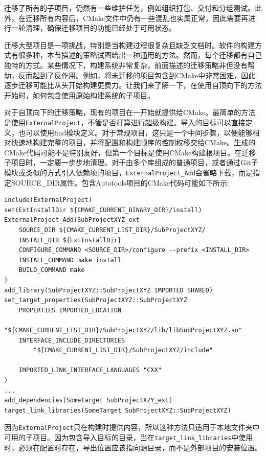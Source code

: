 迁移了所有的子项目，仍然有一些维护任务，例如组织打包、交付和分组测试。此外，在迁移所有内容后，CMake文件中仍有一些混乱也实属正常，因此需要再进行一轮清理，确保迁移项目的功能已经处于可用状态。

迁移大型项目是一项挑战，特别是当构建过程很复杂且缺乏文档时。软件的构建方式有很多种，本节描述的策略试图给出一种通用的方法。然而，每个迁移都有自己独特的方式。某些情况下，构建系统非常复杂，前面描述的迁移策略非但没有帮助，反而起到了反作用。例如，将未迁移的项目包含到CMake中非常困难，因此逐步迁移可能比从头开始构建更费力。让我们来了解一下，在使用自顶向下的方法开始时，如何包含使用原始构建系统的子项目。


对于自顶向下的迁移策略，现有的项目在一开始就提供给CMake。最简单的方法是使用\texttt{ExternalProject}，不管是否打算进行超级构建。导入的目标可以直接定义，也可以使用find模块定义。对于常规项目，这只是一个中间步骤，以便能够相对快速地构建完整的项目，并将配置和构建顺序的控制权移交给CMake。生成的CMake代码可能不是特别友好，但第一个目标是使用CMake构建根项目。在迁移子项目时，一定要一步步地清理。对于由多个库组成的普通项目，或者通过Git子模块或类似的方式引入依赖项的项目，\texttt{ExternalProject\_Add}会省略下载，而是指定SOURCE\_DIR属性。包含Autotools项目的CMake代码可能如下所示:

\begin{lstlisting}[style=styleCMake]
include(ExternalProject)
set(ExtInstallDir ${CMAKE_CURRENT_BINARY_DIR}/install)
ExternalProject_Add(SubProjectXYZ_ext
	SOURCE_DIR ${CMAKE_CURRENT_LIST_DIR}/SubProjectXYZ/
	INSTALL_DIR ${ExtInstallDir}
	CONFIGURE_COMMAND <SOURCE_DIR>/configure --prefix <INSTALL_DIR>
	INSTALL_COMMAND make install
	BUILD_COMMAND make
)
add_library(SubProjectXYZ::SubProjectXYZ IMPORTED SHARED)
set_target_properties(SubProjectXYZ::SubProjectXYZ
	PROPERTIES IMPORTED_LOCATION
		"${CMAKE_CURRENT_LIST_DIR}/SubProjectXYZ/lib/libSubProjectXYZ.so"
	INTERFACE_INCLUDE_DIRECTORIES
		"${CMAKE_CURRENT_LIST_DIR}/SubProjectXYZ/include"
	
	IMPORTED_LINK_INTERFACE_LANGUAGES "CXX"
)
...
add_dependencies(SomeTarget SubProjectXZY_ext)
target_link_libraries(SomeTarget SubProjectXYZ::SubProjectXYZ)
\end{lstlisting}

因为\texttt{ExternalProject}只在构建时提供内容，所以这种方法只适用于本地文件夹中可用的子项目。因为包含导入目标的目录，当在\texttt{target\_link\_libraries}中使用时，必须在配置时存在，导出位置应该指向源目录，而不是外部项目的安装位置。

